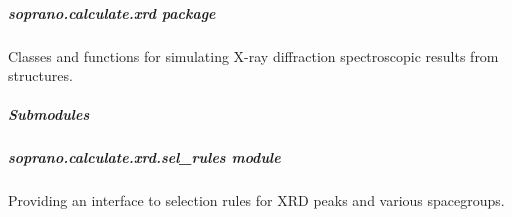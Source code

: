 \documentclass[letterpaper,10pt,english]{sphinxmanual}
\begin{document}

\begin{fulllineitems}
\label{doctree/soprano.calculate.nmr.powder:soprano.calculate.nmr.powder.pwd_avg}
\end{fulllineitems}



\subparagraph{soprano.calculate.xrd package}
\label{doctree/soprano.calculate.xrd:soprano-calculate-xrd-package}\label{doctree/soprano.calculate.xrd::doc}\label{doctree/soprano.calculate.xrd:module-soprano.calculate.xrd}
Classes and functions for simulating X-ray diffraction
spectroscopic results from structures.


\subparagraph{Submodules}
\label{doctree/soprano.calculate.xrd:submodules}

\subparagraph{soprano.calculate.xrd.sel\_rules module}
\label{doctree/soprano.calculate.xrd.sel_rules::doc}\label{doctree/soprano.calculate.xrd.sel_rules:module-soprano.calculate.xrd.sel_rules}\label{doctree/soprano.calculate.xrd.sel_rules:soprano-calculate-xrd-sel-rules-module}
Providing an interface to selection rules for XRD peaks and various
spacegroups.
\end{document}
